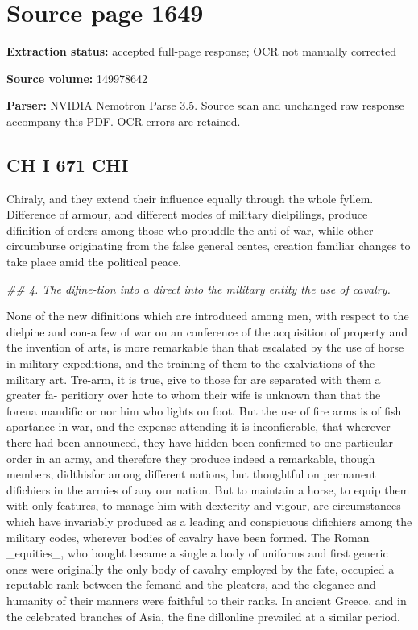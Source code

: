 \clearpage
\section{Source page 1649}
\textbf{Extraction status:} accepted full-page response; OCR not manually corrected\par
\textbf{Source volume:} 149978642\par
\textbf{Parser:} NVIDIA Nemotron Parse 3.5. Source scan and unchanged raw response accompany this PDF. OCR errors are retained.\par\medskip
\subsection*{CH I 671 CHI}
Chiraly, and they extend their influence equally through the whole fyllem. Difference of armour, and different modes of military dielpilings, produce difinition of orders among those who prouddle the anti of war, while other circumburse originating from the false general centes, creation familiar changes to take place amid the political peace.\par\medskip
{\small\itshape \#\# 4. The difine-tion into a direct into the military entity the use of cavalry.\par}\medskip
None of the new difinitions which are introduced among men, with respect to the dielpine and con-a few of war on an conference of the acquisition of property and the invention of arts, is more remarkable than that escalated by the use of horse in military expeditions, and the training of them to the exalviations of the military art. Tre-arm, it is true, give to those for are separated with them a greater fa- peritiory over hote to whom their wife is unknown than that the forena maudific or nor him who lights on foot. But the use of fire arms is of fish apartance in war, and the expense attending it is inconfierable, that wherever there had been announced, they have hidden been confirmed to one particular order in an army, and therefore they produce indeed a remarkable, though members, didthisfor among different nations, but thoughtful on permanent difichiers in the armies of any our nation. But to maintain a horse, to equip them with only features, to manage him with dexterity and vigour, are circumstances which have invariably produced as a leading and conspicuous difichiers among the military codes, wherever bodies of cavalry have been formed. The Roman \_equities\_, who bought became a single a body of uniforms and first generic ones were originally the only body of cavalry employed by the fate, occupied a reputable rank between the femand and the pleaters, and the elegance and humanity of their manners were faithful to their ranks. In ancient Greece, and in the celebrated branches of Asia, the fine dillonline prevailed at a similar period.\par\medskip
